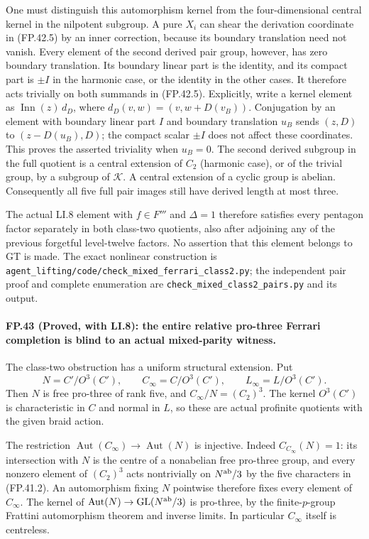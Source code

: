 One must distinguish this automorphism kernel from the
four-dimensional central kernel in the nilpotent subgroup.
A pure $X_i$ can shear the derivation coordinate in (FP.42.5)
by an inner correction, because its boundary translation need
not vanish. Every element of the second derived pair group,
however, has zero boundary translation. Its boundary linear
part is the identity, and its compact part is $\pm I$ in the
harmonic case, or the identity in the other cases.
It therefore acts trivially on both summands in (FP.42.5).
Explicitly, write a kernel element as
$\operatorname{Inn}(z)\,d_D$, where
$d_D(v,w)=(v,w+D(v_B))$. Conjugation by an element with
boundary linear part $I$ and boundary translation $u_B$
sends $(z,D)$ to $(z-D(u_B),D)$; the compact scalar $\pm I$
does not affect these coordinates. This proves the asserted
triviality when $u_B=0$.
The second derived subgroup in the full quotient is a central
extension of $C_2$ (harmonic case), or of the trivial group,
by a subgroup of $\mathcal K$. A central extension of a cyclic
group is abelian. Consequently all five full pair images still
have derived length at most three.

The actual LI.8 element with $f\in F'''$ and $\Delta=1$
therefore satisfies every pentagon factor separately in both
class-two quotients, also after adjoining any of the previous
forgetful level-twelve factors. No assertion that this element
belongs to GT is made. The exact nonlinear construction is
\texttt{agent\_lifting/code/check\_mixed\_ferrari\_class2.py};
the independent pair proof and complete enumeration are
\texttt{check\_mixed\_class2\_pairs.py} and its output.

\paragraph{FP.43 (Proved, with LI.8): the entire relative pro-three Ferrari completion is blind to an actual mixed-parity witness.}
The class-two obstruction has a uniform structural extension.
Put
\[
 N=C'/O^3(C'),\qquad
 C_\infty=C/O^3(C'),\qquad
 L_\infty=L/O^3(C').
 \tag{FP.43.1}
\]
Then $N$ is free pro-three of rank five, and
$C_\infty/N=(C_2)^3$. The kernel $O^3(C')$ is characteristic
in $C$ and normal in $L$, so these are actual profinite
quotients with the given braid action.

The restriction
$\operatorname{Aut}(C_\infty)\to\operatorname{Aut}(N)$
is injective. Indeed $C_{C_\infty}(N)=1$: its intersection
with $N$ is the centre of a nonabelian free pro-three group,
and every nonzero element of $(C_2)^3$ acts nontrivially on
$N^{\rm ab}/3$ by the five characters in (FP.41.2).
An automorphism fixing $N$ pointwise therefore fixes every
element of $C_\infty$. The kernel of
$\operatorname{Aut}(N)\to\operatorname{GL}(N^{\rm ab}/3)$
is pro-three, by the finite-$p$-group Frattini automorphism
theorem and inverse limits. In particular $C_\infty$ itself
is centreless.

